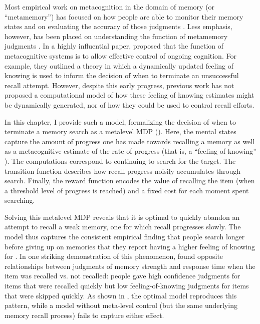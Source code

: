 \documentclass[dsingle]{memo}
\begin{document}
Most empirical work on metacognition in the domain of memory (or ``metamemory'') has focused on how people are able to monitor their memory states \citep{reder1992determines,eakin2005illusions} and on evaluating the accuracy of those judgments \citep{hart1965memory,vesonder1985ability,dunlosky2007metacomprehension}. Less emphasis, however, has been placed on understanding the function of metamemory judgments \citep{schwartz2017metamemory}. In a highly influential paper, \citet{nelson1990metamemory} proposed that the function of metacognitive systems is to allow effective control of ongoing cognition. For example, they outlined a theory in which a dynamically updated feeling of knowing is used to inform the decision of when to terminate an unsuccessful recall attempt. However, despite this early progress, previous work has not proposed a computational model of how these feeling of knowing estimates might be dynamically generated, nor of how they could be used to control recall efforts. 

In this chapter, I provide such a model, formalizing the decision of when to terminate a memory search as a metalevel MDP (). Here, the mental states capture the amount of progress one has made towards recalling a memory as well as a metacognitive estimate of the rate of progress (that is, a ``feeling of knowing'' \citealp{hart1965memory}). The computations correspond to continuing to search for the target. The transition function describes how recall progress noisily accumulates through search. Finally, the reward function encodes the value of recalling the item (when a threshold level of progress is reached) and a fixed cost for each moment spent searching.

Solving this metalevel MDP reveals that it is optimal to quickly abandon an attempt to recall a weak memory, one for which recall progresses slowly. The model thus captures the consistent empirical finding that people search longer before giving up on memories that they report having a higher feeling of knowing for \citealp{nelson1984comparison,nhouyvanisvong1998rapid,gruneberg1977methodological,lachman1979metamemory}. In one striking demonstration of this phenomenon, \citet{costermans1992confidence} found opposite relationships between judgments of memory strength and response time when the item was recalled vs. not recalled: people gave high confidence judgments for items that were recalled quickly but low feeling-of-knowing judgments for items that were skipped quickly. As shown in , the optimal model reproduces this pattern, while a model without meta-level control (but the same underlying memory recall process) fails to capture either effect.
\end{document}
